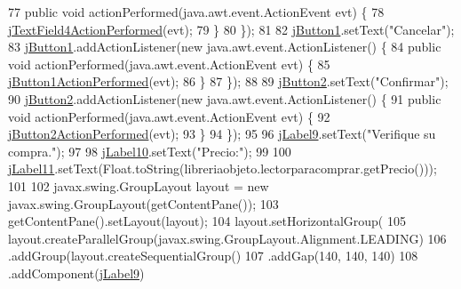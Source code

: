 \begin{DoxyCode}
77             \textcolor{keyword}{public} \textcolor{keywordtype}{void} actionPerformed(java.awt.event.ActionEvent evt) \{
78                 \mbox{\hyperlink{class_interfaz_package_1_1_verificar_lector_a701cb158bcbf5e7944c26e7980de4cb6}{jTextField4ActionPerformed}}(evt);
79             \}
80         \});
81 
82         \mbox{\hyperlink{class_interfaz_package_1_1_verificar_lector_a104af7dfee375e893832d6c38d12a1dd}{jButton1}}.setText(\textcolor{stringliteral}{"Cancelar"});
83         \mbox{\hyperlink{class_interfaz_package_1_1_verificar_lector_a104af7dfee375e893832d6c38d12a1dd}{jButton1}}.addActionListener(\textcolor{keyword}{new} java.awt.event.ActionListener() \{
84             \textcolor{keyword}{public} \textcolor{keywordtype}{void} actionPerformed(java.awt.event.ActionEvent evt) \{
85                 \mbox{\hyperlink{class_interfaz_package_1_1_verificar_lector_ab1cf48292f59166c5e4b0e9a45202b48}{jButton1ActionPerformed}}(evt);
86             \}
87         \});
88 
89         \mbox{\hyperlink{class_interfaz_package_1_1_verificar_lector_a05b1ef2e05306def8a78c0e4ee0802fb}{jButton2}}.setText(\textcolor{stringliteral}{"Confirmar"});
90         \mbox{\hyperlink{class_interfaz_package_1_1_verificar_lector_a05b1ef2e05306def8a78c0e4ee0802fb}{jButton2}}.addActionListener(\textcolor{keyword}{new} java.awt.event.ActionListener() \{
91             \textcolor{keyword}{public} \textcolor{keywordtype}{void} actionPerformed(java.awt.event.ActionEvent evt) \{
92                 \mbox{\hyperlink{class_interfaz_package_1_1_verificar_lector_ac3ea56de497dffbeb0168dcf600f6583}{jButton2ActionPerformed}}(evt);
93             \}
94         \});
95 
96         \mbox{\hyperlink{class_interfaz_package_1_1_verificar_lector_a6b89cc82be1dfb55e197733ceb9f8455}{jLabel9}}.setText(\textcolor{stringliteral}{"Verifique su compra."});
97 
98         \mbox{\hyperlink{class_interfaz_package_1_1_verificar_lector_aa900aa48aa55e9851fd9085b6303d8af}{jLabel10}}.setText(\textcolor{stringliteral}{"Precio:"});
99 
100         \mbox{\hyperlink{class_interfaz_package_1_1_verificar_lector_ae75078bb58455233a13a76d47cca166b}{jLabel11}}.setText(Float.toString(libreriaobjeto.lectorparacomprar.getPrecio()));
101 
102         javax.swing.GroupLayout layout = \textcolor{keyword}{new} javax.swing.GroupLayout(getContentPane());
103         getContentPane().setLayout(layout);
104         layout.setHorizontalGroup(
105             layout.createParallelGroup(javax.swing.GroupLayout.Alignment.LEADING)
106             .addGroup(layout.createSequentialGroup()
107                 .addGap(140, 140, 140)
108                 .addComponent(\mbox{\hyperlink{class_interfaz_package_1_1_verificar_lector_a6b89cc82be1dfb55e197733ceb9f8455}{jLabel9}})

\end{DoxyCode}
